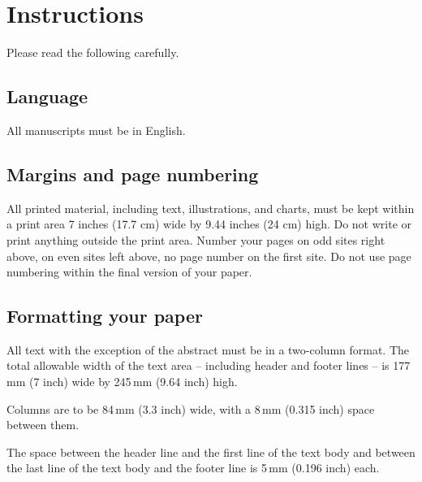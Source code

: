 \documentclass{egpubl}
\begin{document}
\section{Instructions}

Please read the following carefully.

\subsection{Language}

All manuscripts must be in English.

\subsection{Margins and page numbering}

All printed material, including text, illustrations, and charts,
must be kept within a print area %
7 inches (17.7 cm) wide by
9.44 inches (24 cm) high. Do not write or print anything
outside the print area. Number your pages on odd sites right
above, on even sites left above, no page number on the first site.
Do not use page numbering within the final version of your paper.


\subsection{Formatting your paper}

%
All text with the exception of the abstract must be in a two-column format.
The total allowable width of the text area -- including header and footer
lines -- is 177\,mm (7 inch) wide by 245\,mm (9.64 inch) high.

Columns are to be 84\,mm (3.3 inch) wide, with a 8\,mm (0.315 inch) space
between them.

The space between the header line and the first line of the text body and
between the last line of the text body and the footer line is 5\,mm
(0.196 inch) each.
\end{document}
